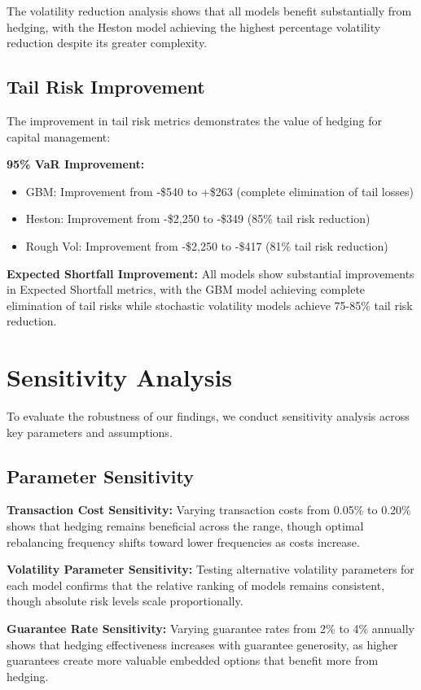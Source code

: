 \documentclass[12pt,a4paper]{report}
\begin{document}
The volatility reduction analysis shows that all models benefit substantially from hedging, with the Heston model achieving the highest percentage volatility reduction despite its greater complexity.

\subsection{Tail Risk Improvement}

The improvement in tail risk metrics demonstrates the value of hedging for capital management:

\textbf{95\% VaR Improvement:}
\begin{itemize}
\item GBM: Improvement from -\$540 to +\$263 (complete elimination of tail losses)
\item Heston: Improvement from -\$2,250 to -\$349 (85\% tail risk reduction)
\item Rough Vol: Improvement from -\$2,250 to -\$417 (81\% tail risk reduction)  
\end{itemize}

\textbf{Expected Shortfall Improvement:}
All models show substantial improvements in Expected Shortfall metrics, with the GBM model achieving complete elimination of tail risks while stochastic volatility models achieve 75-85\% tail risk reduction.

\section{Sensitivity Analysis}

To evaluate the robustness of our findings, we conduct sensitivity analysis across key parameters and assumptions.

\subsection{Parameter Sensitivity}

\textbf{Transaction Cost Sensitivity:}
Varying transaction costs from 0.05\% to 0.20\% shows that hedging remains beneficial across the range, though optimal rebalancing frequency shifts toward lower frequencies as costs increase.

\textbf{Volatility Parameter Sensitivity:}
Testing alternative volatility parameters for each model confirms that the relative ranking of models remains consistent, though absolute risk levels scale proportionally.

\textbf{Guarantee Rate Sensitivity:}
Varying guarantee rates from 2\% to 4\% annually shows that hedging effectiveness increases with guarantee generosity, as higher guarantees create more valuable embedded options that benefit more from hedging.
\end{document}
